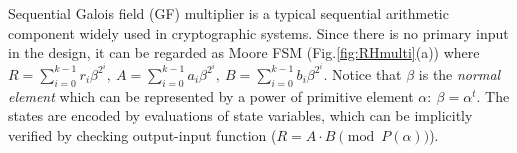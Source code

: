 Sequential Galois field (GF) multiplier is a typical sequential arithmetic component widely used in cryptographic systems.
Since there is no primary input in the design, it can be regarded as Moore FSM (Fig.\ref{fig:RHmulti}(a))
where $R = \sum_{i=0}^{k-1} r_i \beta^{2^{i}}, ~A = \sum_{i=0}^{k-1} a_i
 \beta^{2^{i}}, ~B = \sum_{i=0}^{k-1} b_i \beta^{2^{i}}$. Notice that $\beta$ is the {\it normal element}
 which can be represented by a power of primitive element $\alpha:~\beta = \alpha^t$.
The states are encoded by evaluations of state variables, which can be implicitly verified 
by checking output-input function ($R = A\cdot B \pmod{P(\alpha)}$). 

% 
% 
% 
% 

